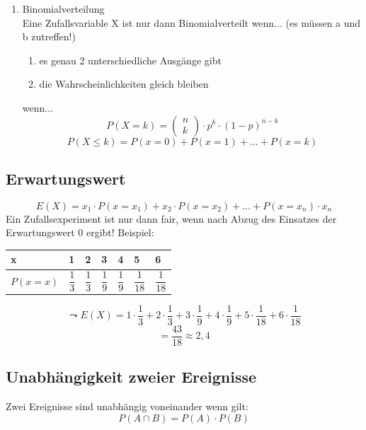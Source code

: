 \documentclass[a4paper, 15pt]{article}
\begin{document}
\begin{enumerate}
\begin{minipage}{.45\textwidth}
\end{minipage}
\item Binomialverteilung\\
Eine Zufallsvariable X ist nur dann Binomialverteilt wenn... (es müssen a und b zutreffen!)
\begin{enumerate}
\item es genau 2 unterschiedliche Ausgänge gibt
\item die Wahrscheinlichkeiten gleich bleiben
\end{enumerate}
wenn...
\begin{equation*}
P(X=k) = \left(\begin{array}{c} n\\k \end{array}\right) \cdot p^k\cdot (1-p)^{n-k}
\end{equation*}
\begin{equation*}
P(X \leq k) = P(x=0)+P(x=1)+\dots+P(x=k)
\end{equation*}
\end{enumerate}
\newpage
\subsection{Erwartungswert}
\begin{equation*}
E(X)= x_ 1 \cdot P(x=x_1)+ x_2 \cdot P(x=x_2)+ \dots +P(x=x_n)\cdot x_n
\end{equation*}
Ein Zufallsexperiment ist nur dann fair, wenn nach Abzug des Einsatzes der Erwartungswert 0 ergibt!\newline\newline
Beispiel:
\begin{center}
\renewcommand{\arraystretch}{2.2}
\begin{tabularx}{10cm}{|l|X|X|X|X|X|X|}
\hline
x&1&2&3&4&5&6 \\
\hline
$P(x=x)$&$\dfrac{1}{3}$&$\dfrac{1}{3}$&$\dfrac{1}{9}$&$\dfrac{1}{9}$&$\dfrac{1}{18}$&$\dfrac{1}{18}$ \\
\hline
\end{tabularx}
\end{center}
\begin{equation*}
\leadsto E(X)= 1\cdot\dfrac{1}{3}+2\cdot\dfrac{1}{3}+3\cdot\dfrac{1}{9}+4\cdot\dfrac{1}{9}+5\cdot\dfrac{1}{18}+6\cdot\dfrac{1}{18}
\end{equation*}
\begin{equation*}
= \dfrac{43}{18} \approx 2,4
\end{equation*}
\subsection{Unabhängigkeit zweier Ereignisse}
Zwei Ereignisse sind unabhängig voneinander wenn gilt:
\begin{equation*}
P(A\cap B)= P(A)\cdot P(B)
\end{equation*}
\end{document}
